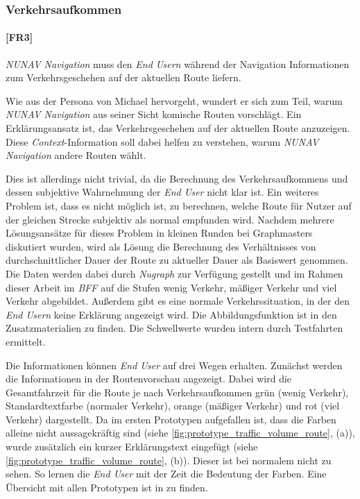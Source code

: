 \subsubsection{Verkehrsaufkommen}
\label{sec:traffic_volume_definition}

\paragraph{[FR3]} \textit{NUNAV Navigation} muss den \textit{End Usern} während der Navigation Informationen zum Verkehrsgeschehen auf der aktuellen Route liefern.

Wie aus der Persona von Michael hervorgeht, wundert er sich zum Teil, warum \textit{NUNAV Navigation} aus seiner Sicht \glqq komische\grqq{} Routen vorschlägt. Ein Erklärungsansatz ist, das Verkehrsgeschehen auf der aktuellen Route anzuzeigen. Diese \textit{Context}-Information soll dabei helfen zu verstehen, warum \textit{NUNAV Navigation} andere Routen wählt. 

Dies ist allerdings nicht trivial, da die Berechnung des Verkehrsaufkommens und dessen subjektive Wahrnehmung der \textit{End User} nicht klar ist. Ein weiteres Problem ist, dass es nicht möglich ist, zu berechnen, welche Route für Nutzer auf der gleichen Strecke subjektiv als \glqq normal\grqq{} empfunden wird. Nachdem mehrere Lösungsansätze für dieses Problem in kleinen Runden bei Graphmasters diskutiert wurden, wird als Lösung die Berechnung des Verhältnisses von durchschnittlicher Dauer der Route zu aktueller Dauer als Basiswert genommen. Die Daten werden dabei durch \textit{Nugraph} zur Verfügung gestellt und im Rahmen dieser Arbeit im \textit{BFF} auf die Stufen \glqq wenig Verkehr\grqq{}, \glqq mäßiger Verkehr\grqq{} und \glqq viel Verkehr\grqq{} abgebildet. Außerdem gibt es eine \glqq normale\grqq{} Verkehrssituation, in der den \textit{End Usern} keine Erklärung angezeigt wird. Die Abbildungsfunktion ist in den Zusatzmaterialien zu finden. Die Schwellwerte wurden intern durch Testfahrten ermittelt.

Die Informationen können \textit{End User} auf drei Wegen erhalten. Zunächst werden die Informationen in der Routenvorschau angezeigt. Dabei wird die Gesamtfahrzeit für die Route je nach Verkehrsaufkommen grün (wenig Verkehr), Standardtextfarbe (normaler Verkehr), orange (mäßiger Verkehr) und rot (viel Verkehr) dargestellt. Da im ersten Prototypen aufgefallen ist, dass die Farben alleine nicht aussagekräftig sind (siehe \autoref{fig:prototype_traffic_volume_route}, (a)), wurde zusätzlich ein kurzer Erklärungstext eingefügt (siehe \autoref{fig:prototype_traffic_volume_route}, (b)). Dieser ist bei \glqq normalem\grqq{} nicht zu sehen. So lernen die \textit{End User} mit der Zeit die Bedeutung der Farben. Eine Übersicht mit allen Prototypen ist in  zu finden.

